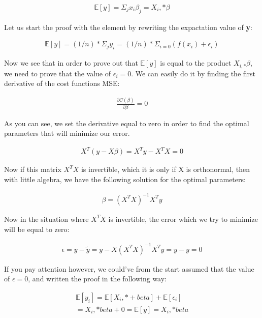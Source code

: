 \documentclass[a4paper, 10pt]{article}
\begin{document}
\begin{gather*}
	\mathbb{E}[y] = \Sigma_{j} x_{i} \beta_{j} = X_i,* \beta 
\end{gather*}

Let us start the proof with the element by rewriting the expactation value of \textbf{y}:

\begin{gather*}
	\mathbb{E}[y] = (1/n)*\Sigma_{j} y_{i} = (1/n)*\Sigma_{i=0} (f(x_i) + \epsilon_i) 
\end{gather*}

Now we see that in order to prove out that $\mathbb{E}[y]$ is equal to the product $X_{i,*}\beta$, we need to prove that the value of $\epsilon_{i} = 0$. We can easily do it by finding the first derivative of the cost functions MSE: 

\begin{gather*}
	\frac{\partial C(\beta)}{\partial \beta} = 0
\end{gather*}

As you can see, we set the derivative equal to zero in order to find the optimal parameters that will minimize our error. 

\begin{gather*}
	X^T(y-X\beta) = X^Ty - X^TX = 0
\end{gather*}

Now if this matrix $X^TX$ is invertible, which it is only if X is orthonormal, then with little algebra, we have the following solution for the optimal parameters: 

\begin{gather*}
	\beta = (X^TX)^{-1}X^Ty
\end{gather*}

Now in the situation where $X^TX$ is invertible, the error which we try to minimize will be equal to zero: 

\begin{gather*}
	\epsilon = y - \tilde{y} = y - X(X^TX)^{-1}X^Ty = y - y = 0 
\end{gather*}

If you pay attention however, we could've from the start assumed that the value of $\epsilon=0$, and written the proof in the following way: 

\begin{gather*}
	\mathbb{E}[y_i] = \mathbb{E}[X_i,*+beta] + \mathbb{E}[\epsilon_i] \\
						= X_i,*beta + 0 = \mathbb{E}[y] = X_i,*beta
\end{gather*}
\end{document}
